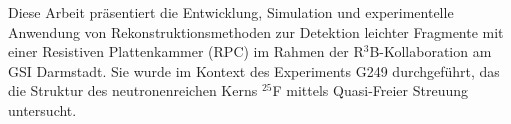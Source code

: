 
%








Diese Arbeit präsentiert die Entwicklung, Simulation und experimentelle Anwendung von Rekonstruktionsmethoden zur Detektion leichter Fragmente mit einer Resistiven Plattenkammer (RPC) im Rahmen der R$^3$B-Kollaboration am GSI Darmstadt. Sie wurde im Kontext des Experiments G249 durchgeführt, das die Struktur des neutronenreichen Kerns $^{25}$F mittels Quasi-Freier Streuung untersucht.

